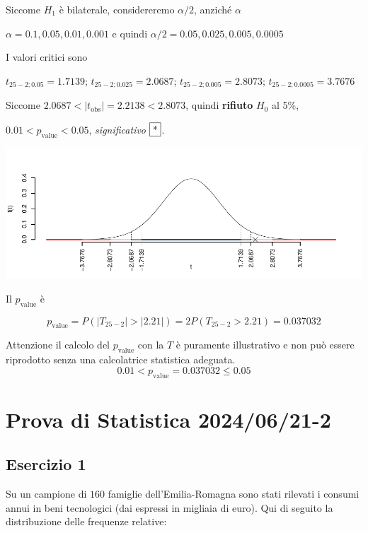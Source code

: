 \documentclass[
  11pt,
]{book}
\theoremstyle{mytheoremstyle}
\theoremstyle{mydefstyle}
\newenvironment{sol}
  {
  \begin{tcolorbox}[enhanced,breakable,arc=0.1mm,boxrule=1pt,colback=white,colframe=iblue,
  title=\bf \fontfamily{lmss}\selectfont \hspace{.5 cm} Soluzione,drop fuzzy shadow]

}{
\end{tcolorbox}
  }
\begin{document}
\begin{sol}
Siccome \(H_1\) è bilaterale, considereremo \(\alpha/2\),
anziché \(\alpha\)

\(\alpha=0.1, 0.05, 0.01, 0.001\) e quindi \(\alpha/2=0.05, 0.025, 0.005, 0.0005\)

I valori critici sono

\(t_{25-2;0.05}=1.7139\); \(t_{25-2;0.025}=2.0687\); \(t_{25-2;0.005}=2.8073\); \(t_{25-2;0.0005}=3.7676\)

Siccome \(2.0687<|t_\text{obs}|=2.2138<2.8073\), quindi \textbf{rifiuto} \(H_0\) al 5\%,

\(0.01<p_\text{value}<0.05\), \emph{significativo} \(\fbox{*}\).

\begin{center}\includegraphics{Esami_passati_con_soluzioni_files/figure-latex/2024-81-1} \end{center}

Il \(p_{\text{value}}\) è

\[ p_{\text{value}} = P(|T_{25-2}|>|2.21|)=2P(T_{25-2}>2.21)=0.037032 \]

Attenzione il calcolo del \(p_\text{value}\) con la \(T\) è puramente illustrativo e non può essere riprodotto senza una calcolatrice statistica adeguata.\[
 0.01 < p_\text{value}= 0.037032 \leq 0.05 
\]

\end{sol}

\section{Prova di Statistica 2024/06/21-2}\label{prova-di-statistica-20240621-2}

\subsection{Esercizio 1}\label{esercizio-1-39}

Su un campione di \(160\) famiglie dell'Emilia-Romagna sono stati rilevati i consumi annui in beni tecnologici (dai espressi in migliaia di euro). Qui di seguito la distribuzione delle frequenze relative:
\end{document}
